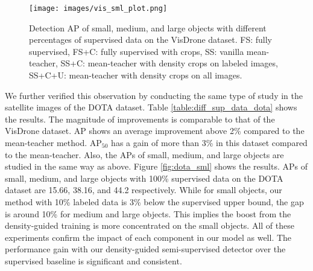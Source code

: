 \begin{figure}[t]
  \centering
  \texttt{[image: images/vis\_sml\_plot.png]} 
  \caption{Detection AP of small, medium, and large objects with different percentages of supervised data on the VisDrone dataset. FS: fully supervised, FS+C: fully supervised with crops, SS: vanilla mean-teacher, SS+C: mean-teacher with density crops on labeled images, SS+C+U: mean-teacher with density crops on all images.}
  \label{fig:vis_sml}
\end{figure}

We further verified this observation  by conducting the same type of study in the satellite images of the DOTA dataset. Table \ref{table:diff_sup_data_dota} shows the results. The magnitude of improvements is comparable to that of the VisDrone dataset. AP shows an average improvement above 2\% compared to the mean-teacher method. $\textrm{AP}_{50}$ has a gain of more than 3\% in this dataset compared to the mean-teacher. Also, the APs of small, medium, and large objects are studied in the same way as above. Figure \ref{fig:dota_sml} shows the results. APs of small, medium, and large objects with 100\% supervised data on the DOTA dataset are 15.66, 38.16, and 44.2 respectively. While for small objects, our method with 10\% labeled data is 3\% below the supervised upper bound, the gap is around 10\% for medium and large objects. This implies the boost from the density-guided training is more concentrated on the small objects. All of these experiments confirm the impact of each component in our model as well. The performance gain with our density-guided semi-supervised detector over the supervised baseline is significant and consistent.
